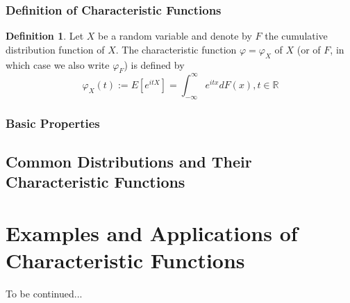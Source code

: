 \documentclass{article}
\theoremstyle{definition}
\newtheorem{definition}{Definition}[section]
\newcommand{\reals}{\mathbb{R}}
\begin{document}
\subsubsection{Definition of Characteristic Functions}
\begin{definition}
	Let $X$ be a random variable and denote by $F$ the cumulative distribution function of $X$. The characteristic function $\varphi=\varphi_X$ of $X$ (or of $F$, in which case we also write $\varphi_F$) is defined by \textnormal{\cite{cfms}}
	$$\varphi_X(t):=E[e^{itX}]=\int_{-\infty}^\infty e^{itx}dF(x), t\in\reals$$
\end{definition}
\subsubsection{Basic Properties}
\subsection{Common Distributions and Their Characteristic Functions}
\section{Examples and Applications of Characteristic Functions}
To be continued...
\medskip



\end{document}
